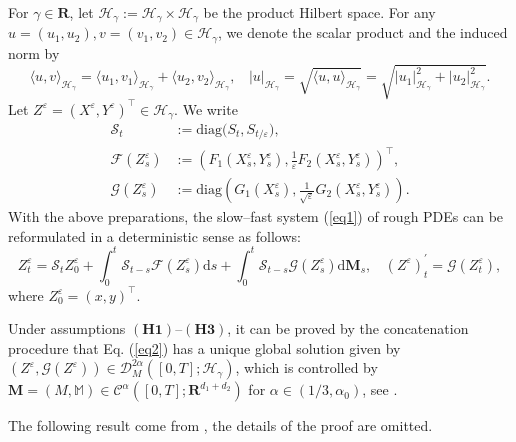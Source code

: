 \documentclass[10pt,a4paper]{article}
\numberwithin{equation}{section}
\begin{document}
For $\gamma \in \mathbf R$,
let $\mathscr H_\gamma:=\mathcal{H}_\gamma \times \mathcal{H}_\gamma$ be the product Hilbert space. For any $u=(u_1,u_2),v=(v_1,v_2)\in\mathscr{H}_\gamma$, we denote the scalar product and the induced norm by
$$\langle u,v \rangle_{\mathscr{H}_\gamma}=\langle u_1,v_1\rangle_{\mathcal{H}_\gamma}+\langle u_2,
v_2\rangle_{\mathcal{H}_\gamma},~~~~|u|_{\mathscr{H}_\gamma}=\sqrt{\langle u,u\rangle_{\mathscr{H}_\gamma}}=\sqrt{|u_1|_{\mathcal{H}_\gamma}^2+|u_2|_{\mathcal{H}_\gamma}^2}.$$
Let $Z^\varepsilon=(X^\varepsilon, Y^\varepsilon)^\top \in \mathscr H_\gamma$. We write
\begin{align*}
	\mathcal S_t&:=\text{diag} \big( S_t ,S_{t/\varepsilon} \big),\\
	\mathcal F(Z_s^\varepsilon)&:= \left( F_1(X_s^\varepsilon, Y_s^\varepsilon), \frac 1 \varepsilon  F_2 (X_s^\varepsilon, Y_s^\varepsilon)\right)^\top, \\
	\mathcal G(Z_s^\varepsilon)&:= \text{diag} \left( G_1(X_s^\varepsilon), \frac 1 {\sqrt{\varepsilon}}  G_2 (X_s^\varepsilon, Y_s^\varepsilon)\right).
\end{align*}
With the above preparations, the slow--fast system (\ref{eq1}) of rough PDEs can be reformulated in a deterministic sense as follows:
\begin{equation} \label{eq2}
Z_t^\varepsilon= \mathcal S_t Z_0^\varepsilon+\int_0^t \mathcal{S}_{t-s} \mathcal F(Z_s^\varepsilon) \mathrm{d} s+\int_0^t \mathcal{S}_{t-s} \mathcal G(Z_s^\varepsilon) \mathrm{d} \mathbf M_s,  ~~~~(Z^\varepsilon)_t^\prime=\mathcal G(Z_t^\varepsilon),
\end{equation}
where $Z_0^\varepsilon=(x, y)^\top$.





Under assumptions $(\mathbf{H1})$--$(\mathbf{H3})$,
it can be proved by the concatenation procedure that Eq. (\ref{eq2}) has a unique global solution given by $(Z^\varepsilon, \mathcal G(Z^\varepsilon)) \in \mathcal{D}_{M}^{2\alpha}([0,T];\mathscr{H}_\gamma)$,
which is controlled by $\mathbf M=(M, \mathbb M) \in \mathscr{C}^\alpha ([0,T]; \mathbf R^{d_1+d_2})$ for $\alpha \in (1/3, \alpha_0)$, see \cite[Theorem 3.2]{HN22}.



The following result come from \cite[Lemma 3.1]{LLPX25}, the details of the proof are omitted.
\end{document}
